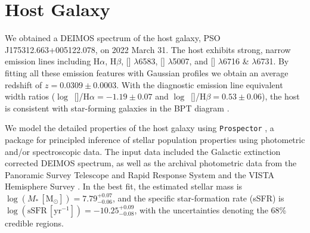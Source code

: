 \documentclass[twocolumn]{aastex631}
\begin{document}
\section{Host Galaxy} \label{sec:host}
We obtained a DEIMOS spectrum of the host galaxy, PSO J175312.663+005122.078, on 2022 March 31. The host exhibits strong, narrow emission lines including H$\alpha$, H$\beta$, [] $\lambda$6583, [] $\lambda$5007, and [] $\lambda$6716 \& $\lambda$6731. By fitting all these emission features with Gaussian profiles we obtain an average redshift of $z=0.0309\pm0.0003$. With the diagnostic emission line equivalent width ratios ($\log$~[]/H$\alpha=-1.19\pm0.07$ and $\log$~[]/H$\beta=0.53\pm0.06$), the host is consistent with star-forming galaxies in the BPT diagram \citep{BPT_1981, Veilleux_1987}. 

We model the detailed properties of the host galaxy using \texttt{Prospector} \citep{Johnson_prospector_2021}, a package for principled inference of stellar population properties using photometric and/or spectroscopic data. The input data included the Galactic extinction corrected DEIMOS spectrum, as well as the archival photometric data from the Panoramic Survey Telescope and Rapid Response System \citep[Pan-STARRS;][{\it r, i, z} Kron magnitudes]{PS1_2016}  and the VISTA Hemisphere Survey \citep[VHS;][J and $\mathrm{K}_\mathrm{s}$ Petrosian magnitudes]{VHS_2013}. In the best fit, the estimated stellar mass is $\log (M_*\,[\mathrm{M_\odot}])=7.79_{-0.06}^{+0.07}$, and the specific star-formation rate (sSFR) is $\log (\mathrm{sSFR}\,[\mathrm{yr}^{-1}])=-10.25_{-0.08}^{+0.09}$, with the uncertainties denoting the 68\% credible regions.
\end{document}
